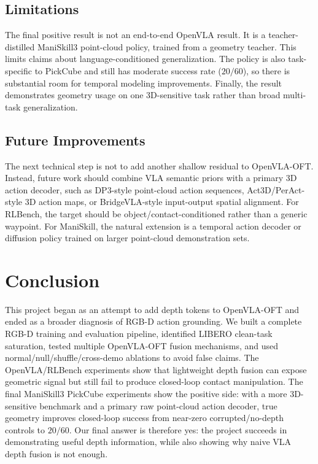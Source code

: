 \documentclass[conference]{IEEEtran}
\begin{document}
\subsection{Limitations}

The final positive result is not an end-to-end OpenVLA result. It is a teacher-distilled ManiSkill3 point-cloud policy, trained from a geometry teacher. This limits claims about language-conditioned generalization. The policy is also task-specific to PickCube and still has moderate success rate ($20/60$), so there is substantial room for temporal modeling improvements. Finally, the result demonstrates geometry usage on one 3D-sensitive task rather than broad multi-task generalization.

\subsection{Future Improvements}

The next technical step is not to add another shallow residual to OpenVLA-OFT. Instead, future work should combine VLA semantic priors with a primary 3D action decoder, such as DP3-style point-cloud action sequences, Act3D/PerAct-style 3D action maps, or BridgeVLA-style input-output spatial alignment. For RLBench, the target should be object/contact-conditioned rather than a generic waypoint. For ManiSkill, the natural extension is a temporal action decoder or diffusion policy trained on larger point-cloud demonstration sets.

\section{Conclusion}

This project began as an attempt to add depth tokens to OpenVLA-OFT and ended as a broader diagnosis of RGB-D action grounding. We built a complete RGB-D training and evaluation pipeline, identified LIBERO clean-task saturation, tested multiple OpenVLA-OFT fusion mechanisms, and used normal/null/shuffle/cross-demo ablations to avoid false claims. The OpenVLA/RLBench experiments show that lightweight depth fusion can expose geometric signal but still fail to produce closed-loop contact manipulation. The final ManiSkill3 PickCube experiments show the positive side: with a more 3D-sensitive benchmark and a primary raw point-cloud action decoder, true geometry improves closed-loop success from near-zero corrupted/no-depth controls to $20/60$. Our final answer is therefore yes: the project succeeds in demonstrating useful depth information, while also showing why naive VLA depth fusion is not enough.
\end{document}
